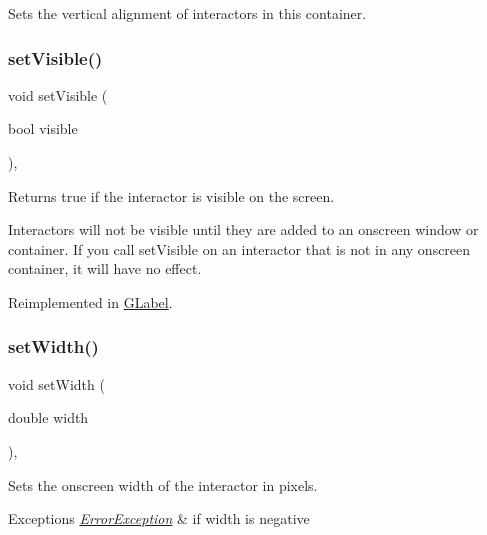Sets the vertical alignment of interactors in this container. 

\mbox{\label{classGInteractor_a18e44e30b31525a243960ca3928125aa}} 
\subsubsection{\texorpdfstring{set\+Visible()}{setVisible()}}
{\footnotesize\ttfamily void set\+Visible (\begin{DoxyParamCaption}\item[{bool}]{visible }\end{DoxyParamCaption})\hspace{0.3cm}{\ttfamily [virtual]}, {\ttfamily [inherited]}}



Returns true if the interactor is visible on the screen. 

Interactors will not be visible until they are added to an onscreen window or container. If you call set\+Visible on an interactor that is not in any onscreen container, it will have no effect. 

Reimplemented in \mbox{\hyperlink{classGLabel_a95c2a1221e6c59e9de544054963b4b18}{G\+Label}}.

\mbox{\label{classGInteractor_aa3f3fba4cb131baa8696ba01e3bceca1}} 
\subsubsection{\texorpdfstring{set\+Width()}{setWidth()}}
{\footnotesize\ttfamily void set\+Width (\begin{DoxyParamCaption}\item[{double}]{width }\end{DoxyParamCaption})\hspace{0.3cm}{\ttfamily [virtual]}, {\ttfamily [inherited]}}



Sets the onscreen width of the interactor in pixels. 


\begin{DoxyExceptions}{Exceptions}
{\em \mbox{\hyperlink{classErrorException}{Error\+Exception}}} & if width is negative \\
\hline
\end{DoxyExceptions}



